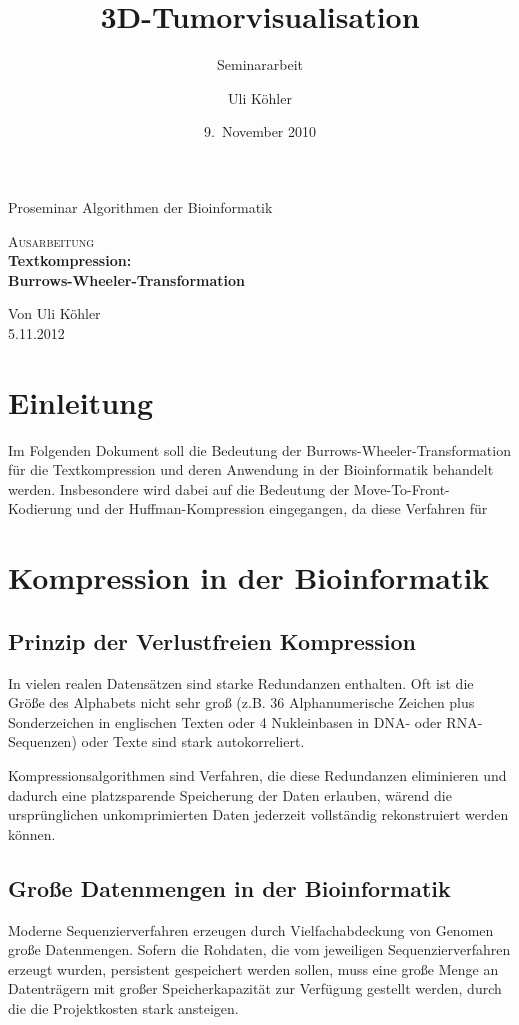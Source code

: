 \documentclass[ngerman,pdftex,paper=A4,DIV=calc,titlepage,12pt]{scrartcl}
\title{3D-Tumorvisualisation}
\subtitle{Seminararbeit}
\author{Uli Köhler}
\date{9.~November 2010}
\newtheorem[L]{boxedDefinition}{Definition}
\begin{document}
\begin{titlepage}
\begin{center}
 Proseminar \glqq Algorithmen der Bioinformatik\grqq
 \end{center}
\vspace{4cm}
\begin{center}
  
 \large\textsc{Ausarbeitung}\\[5mm]
 {\Huge\centering\bfseries\selectfont Textkompression:\\Burrows-Wheeler-Transformation}\\[2cm]
\begin{center}
  Von Uli Köhler\\
  5.11.2012
\end{center}
\vspace{2cm}
\end{center}
\end{titlepage}
\thispagestyle{empty}\newpage %
\tableofcontents\thispagestyle{empty}\newpage 
\section{Einleitung}
Im Folgenden Dokument soll die Bedeutung der Burrows-Wheeler-Transformation für die Textkompression und deren Anwendung in der Bioinformatik behandelt werden. Insbesondere wird dabei auf die Bedeutung der Move-To-Front-Kodierung und der Huffman-Kompression eingegangen, da diese Verfahren für 
\section{Kompression in der Bioinformatik}
\subsection{Prinzip der Verlustfreien Kompression}
In vielen realen Datensätzen sind starke Redundanzen enthalten. Oft ist die Größe des Alphabets nicht sehr groß (z.B. 36 Alphanumerische Zeichen plus Sonderzeichen in englischen Texten oder 4 Nukleinbasen in DNA- oder RNA-Sequenzen) oder Texte sind stark autokorreliert.

Kompressionsalgorithmen sind Verfahren, die diese Redundanzen eliminieren und dadurch eine platzsparende Speicherung der Daten erlauben, wärend die ursprünglichen unkomprimierten Daten jederzeit vollständig rekonstruiert werden können.
\subsection{Große Datenmengen in der Bioinformatik}
Moderne Sequenzierverfahren erzeugen durch Vielfachabdeckung von Genomen große Datenmengen. Sofern die Rohdaten, die vom jeweiligen Sequenzierverfahren erzeugt wurden, persistent gespeichert werden sollen, muss eine große Menge an Datenträgern mit großer Speicherkapazität zur Verfügung gestellt werden, durch die die Projektkosten stark ansteigen.
\end{document}
